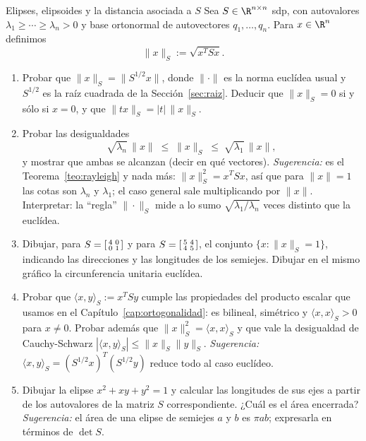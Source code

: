 \begin{entrega}{Elipses, elipsoides y la distancia asociada a $S$}
\label{ent:elipses}
Sea $S\in\R^{n\times n}$ sdp, con autovalores
$\lambda_1\ge\cdots\ge\lambda_n>0$ y base ortonormal de autovectores
$q_1,\dots,q_n$. Para $x\in\R^n$ definimos
\[
\|x\|_S := \sqrt{x^TSx} .
\]
\begin{enumerate}[label=\textbf{(\alph*)},itemsep=3pt,topsep=4pt]
\item Probar que $\|x\|_S = \|S^{1/2}x\|$, donde $\|\cdot\|$ es la norma
euclídea usual y $S^{1/2}$ es la raíz cuadrada de la
Sección~\ref{sec:raiz}. Deducir que $\|x\|_S=0$ si y sólo si $x=0$, y que
$\|tx\|_S=|t|\,\|x\|_S$.

\item Probar las desigualdades
\[
\sqrt{\lambda_n}\,\|x\| \;\le\; \|x\|_S \;\le\; \sqrt{\lambda_1}\,\|x\| ,
\]
y mostrar que ambas se alcanzan (decir en qué vectores). \emph{Sugerencia:}
es el Teorema~\ref{teo:rayleigh} y nada más: $\|x\|_S^2=x^TSx$, así que para
$\|x\|=1$ las cotas son $\lambda_n$ y $\lambda_1$; el caso general sale
multiplicando por $\|x\|$. Interpretar: la ``regla'' $\|\cdot\|_S$ mide a lo
sumo $\sqrt{\lambda_1/\lambda_n}$ veces distinto que la euclídea.

\item Dibujar, para $S=\begin{bsmallmatrix} 4 & 0\\ 0 & 1\end{bsmallmatrix}$ y
para $S=\begin{bsmallmatrix} 5 & 4\\ 4 & 5\end{bsmallmatrix}$, el conjunto
$\{x : \|x\|_S=1\}$, indicando las direcciones y las longitudes de los
semiejes. Dibujar en el mismo gráfico la circunferencia unitaria euclídea.

\item Probar que $\langle x,y\rangle_S := x^TSy$ cumple las propiedades del
producto escalar que usamos en el Capítulo~\ref{cap:ortogonalidad}:
es bilineal, simétrico y $\langle x,x\rangle_S>0$ para $x\neq0$. Probar además
que $\|x\|_S^2 = \langle x,x\rangle_S$ y que vale la desigualdad de
Cauchy-Schwarz $|\langle x,y\rangle_S| \le \|x\|_S\|y\|_S$.
\emph{Sugerencia:} $\langle x,y\rangle_S = (S^{1/2}x)^T(S^{1/2}y)$ reduce todo
al caso euclídeo.

\item Dibujar la elipse $x^2+xy+y^2=1$ y calcular las longitudes de sus ejes a
partir de los autovalores de la matriz $S$ correspondiente. ¿Cuál es el área
encerrada? \emph{Sugerencia:} el área de una elipse de semiejes $a$ y $b$ es
$\pi ab$; expresarla en términos de $\det S$.


\end{enumerate}
\end{entrega}
